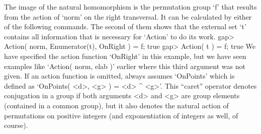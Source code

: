 %

The image of  the natural homomorphism  is the permutation group `f' that
results from the action of `norm' on the right  transversal. It can be
calculated by either of the following commands. The second of them shows
that the external set `t' contains all information  that is necessary for
`Action' to do its work.
\beginexample
gap> Action( norm, Enumerator(t), OnRight ) = f;
true
gap> Action( t ) = f;
true
\endexample
We  have specified the action function  `OnRight' in this example, but
we have seen  examples like `Action( norm,  elab )' earlier where this
third argument was not given. If an action function is omitted, {\GAP}
always assumes `OnPoints' which is defined as `OnPoints( <d>, <g> ) = <d>
^ <g>'. This ``caret''  operator denotes conjugation in  a group if  both
arguments <d> and  <g> are group elements  (contained in a common group),
but it also  denotes the natural  action  of permutations on  positive
integers (and exponentiation of integers as well, of course).

%

%  

